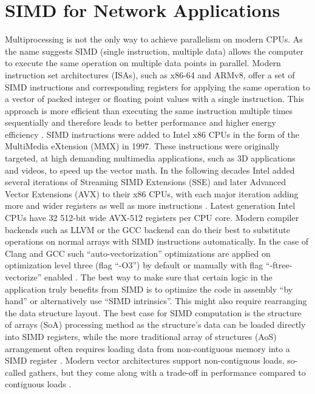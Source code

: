 \section{SIMD for Network Applications}
Multiprocessing is not the only way to achieve parallelism on modern CPUs. As the name suggests SIMD (single instruction, multiple data) allows the computer to execute the same operation on multiple data points in parallel. Modern instruction set architectures (ISAs), such as x86-64 and ARMv8, offer a set of SIMD instructions and corresponding registers for applying the same operation to a vector of packed integer or floating point values with a single instruction. This approach is more efficient than executing the same instruction multiple times sequentially and therefore leads to better performance and higher energy efficiency \cite{kagan:mmx, henpat:computer_arch}. \newline
SIMD instructions were added to Intel x86 CPUs in the form of the MultiMedia eXtension (MMX) in 1997. These instructions were originally targeted, at high demanding multimedia applications, such as 3D applications and videos, to speed up the vector math. In the following decades Intel added several iterations of Streaming SIMD Extensions (SSE) and later Advanced Vector Extensions (AVX) to their x86 CPUs, with each major iteration adding more and wider registers as well as more instructions \cite{man:avx}. Latest generation Intel CPUs have 32 512-bit wide AVX-512 registers per CPU core.\newline
Modern compiler backends such as LLVM or the GCC backend can do their best to substitute operations on normal arrays with SIMD instructions automatically. In the case of Clang and GCC such “auto-vectorization” optimizations are applied on optimization level three (flag “-O3”) by default or manually with flag “-ftree-vectorize” enabled \cite{doc:llvm_vec, doc:gcc_vec}. \newline
The best way to make sure that certain logic in the application truly benefits from SIMD is to optimize the code in assembly “by hand” or alternatively use “SIMD intrinsics”. This might also require rearranging the data structure layout. The best case for SIMD computation is the structure of arrays (SoA) processing method as the structure’s data can be loaded directly into SIMD registers, while the more traditional array of structures (AoS) arrangement often requires loading data from non-contiguous memory into a SIMD register \cite{intel:soaaos}. Modern vector architectures support non-contiguous loads, so-called gathers, but they come along with a trade-off in performance compared to contiguous loads \cite{henpat:computer_arch}. \newline
